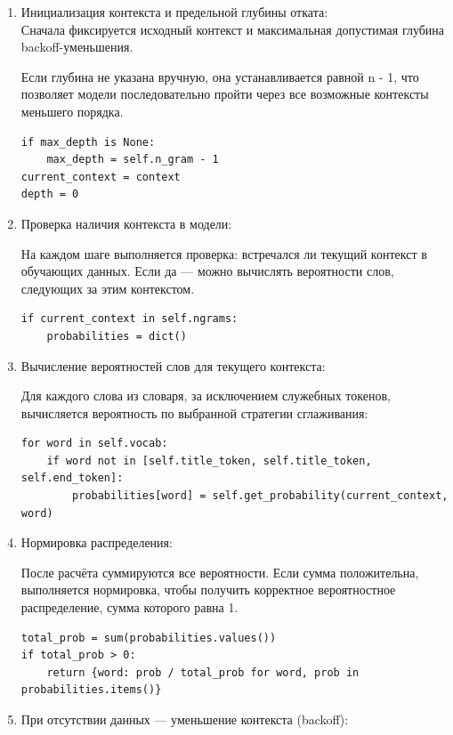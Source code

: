 \documentclass[coursework]{SCWorks}
\begin{document}
    \begin{enumerate}
        \item Инициализация контекста и предельной глубины отката: \\
        Сначала фиксируется исходный контекст и максимальная допустимая глубина backoff-уменьшения.

        Если глубина не указана вручную, она устанавливается равной n - 1, что позволяет модели последовательно пройти
        через все возможные контексты меньшего порядка.

        \begin{verbatim}
if max_depth is None:
    max_depth = self.n_gram - 1
current_context = context
depth = 0
        \end{verbatim}

        \item Проверка наличия контекста в модели:

        На каждом шаге выполняется проверка: встречался ли текущий контекст в обучающих данных.
        Если да — можно вычислять вероятности слов, следующих за этим контекстом.
        \begin{verbatim}
if current_context in self.ngrams:
    probabilities = dict()
        \end{verbatim}

        \item Вычисление вероятностей слов для текущего контекста:

        Для каждого слова из словаря, за исключением служебных токенов, вычисляется вероятность по выбранной стратегии сглаживания:

        \begin{verbatim}
for word in self.vocab:
    if word not in [self.title_token, self.title_token, self.end_token]:
        probabilities[word] = self.get_probability(current_context, word)
        \end{verbatim}

        \item Нормировка распределения:

        После расчёта суммируются все вероятности.
        Если сумма положительна, выполняется нормировка, чтобы получить корректное вероятностное распределение, сумма которого равна 1.
        \begin{verbatim}
total_prob = sum(probabilities.values())
if total_prob > 0:
    return {word: prob / total_prob for word, prob in probabilities.items()}
        \end{verbatim}
        \item При отсутствии данных — уменьшение контекста (backoff):


\end{enumerate}
\end{document}
